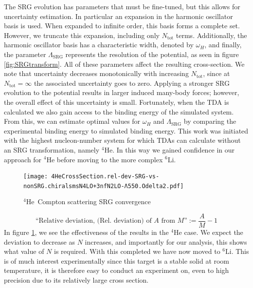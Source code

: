 \documentclass[a4paper,11pt]{article}
\newcommand{\Ntot}{N_{\mathrm{tot}}}
\newcommand{\LamSRG}{\Lambda_{\mathrm{SRG}}}
\newcommand{\LiS}{{}^{6} \mathrm{Li} }
\newcommand{\HeF}{{}^{4} \mathrm{He}}
\begin{document}
The SRG evolution has parameters that must be fine-tuned, but this allows for uncertainty estimation.
In particular an expansion in the harmonic oscillator basis is used.
When expanded to infinite order, this basis forms a complete set. However, we truncate
this expansion, including only $N_{\mathrm{tot}}$ terms.
Additionally, the harmonic oscillator basis has a characteristic
width, denoted by $\omega_H$, and finally, the parameter $\LamSRG$
represents the resolution of the potential, as seen in figure
\ref{fig:SRGtransform}. 
All of these parameters affect the resulting cross-section. 
We note that uncertainty decreases monotonically with increasing $\Ntot$, since at $\Ntot=\infty$ the associated uncertainty goes to zero.
Applying a stronger SRG evolution to the potential results in larger induced many-body forces; however, the overall
effect of this uncertainty is small.
Fortunately, when the TDA is calculated we also gain access to the binding energy of the simulated system.
From this, we can estimate optimal values for $\omega_H$ and $\LamSRG$ by comparing the experimental binding energy to simulated binding energy.
This work was initiated with the highest nucleon-number system for which  TDAs can
calculate without an SRG transformation, namely
$\HeF$. In this way we gained confidence in our approach for $\HeF$ before moving
to the more complex $\LiS$.
\begin{figure}[H]
  \begin{center}
    \texttt{[image:  4HeCrossSection.rel-dev-SRG-vs-nonSRG.chiralsmsN4LO+3nfN2LO-Λ550.Odelta2.pdf]}
    \caption{$\HeF$\, Compton scattering SRG convergence}
    \label{fig:SRGConverge4He}
  \end{center}
\end{figure}
\begin{equation}
  \text{``Relative deviation, (Rel. deviation) of $A$ from $M$''}:= \frac{A}{M}-1  
\end{equation}
In figure \ref{fig:SRGConverge4He}, we see the effectiveness of the results in the $\HeF$ case.
We expect the deviation to decrease as $N$ increases, and importantly for our analysis, this shows what value of $N$ is required.
With this completed we have now moved to $\LiS$.
This is of much interest experimentally since this target is a stable solid at room temperature,
it is therefore easy to conduct an experiment on, even to high precision due to its relatively large
cross section.
\end{document}
